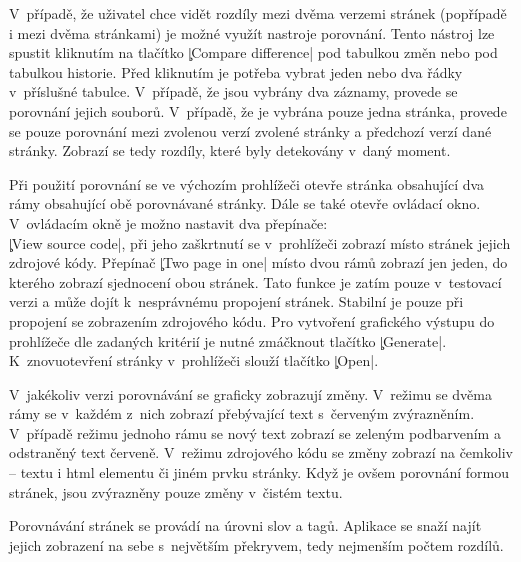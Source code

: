 V~případě, že uživatel chce vidět rozdíly mezi dvěma verzemi stránek (popřípadě i mezi dvěma stránkami) je možné využít nastroje porovnání.
Tento nástroj lze spustit kliknutím na tlačítko \c|Compare difference| pod tabulkou změn nebo pod tabulkou historie.
Před kliknutím je potřeba vybrat jeden nebo dva řádky v~příslušné tabulce.
V~případě, že jsou vybrány dva záznamy, provede se porovnání jejich souborů.
V~případě, že je vybrána pouze jedna stránka, provede se pouze porovnání mezi zvolenou verzí zvolené stránky a předchozí verzí dané stránky.
Zobrazí se tedy rozdíly, které byly detekovány v~daný moment.

Při použití porovnání se ve výchozím prohlížeči otevře stránka obsahující dva rámy obsahující obě porovnávané stránky.
Dále se také otevře ovládací okno.
V~ovládacím okně je možno nastavit dva přepínače:\\
\c|View source code|, při jeho zaškrtnutí se v~prohlížeči zobrazí místo stránek jejich zdrojové kódy.
Přepínač \c|Two page in one| místo dvou rámů zobrazí jen jeden, do kterého zobrazí sjednocení obou stránek.
Tato funkce je zatím pouze v~testovací verzi a může dojít k~nesprávnému propojení stránek. Stabilní je pouze při propojení se zobrazením zdrojového kódu.
Pro vytvoření grafického výstupu do prohlížeče dle zadaných kritérií je nutné zmáčknout tlačítko \c|Generate|.
K~znovuotevření stránky v~prohlížeči slouží tlačítko \c|Open|.

V~jakékoliv verzi porovnávání se graficky zobrazují změny.
V~režimu se dvěma rámy se v~každém z~nich zobrazí přebývající text s~červeným zvýrazněním.
V~případě režimu jednoho rámu se nový text zobrazí se zeleným podbarvením a odstraněný text červeně.
V~režimu zdrojového kódu se změny zobrazí na čemkoliv -- textu i html elementu či jiném prvku stránky.
Když je ovšem porovnání formou stránek, jsou zvýrazněny pouze změny v~čistém textu.

Porovnávání stránek se provádí na úrovni slov a tagů.
Aplikace se snaží najít jejich zobrazení na sebe s~největším překryvem,  tedy nejmenším počtem rozdílů.
